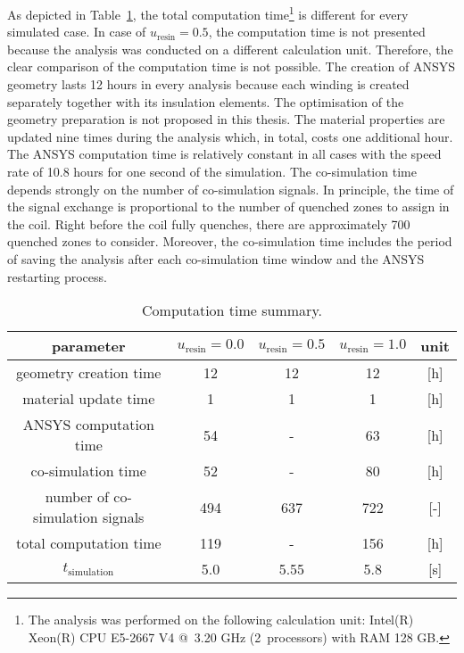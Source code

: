 As depicted in Table~\ref{table:skew_quad_computation_time_summary}, the total computation time\footnote{The analysis was performed on the following calculation unit: Intel(R) Xeon(R) CPU E5-2667 V4 @~3.20 GHz (2~processors) with RAM 128 GB.} is different for every simulated case. In case of $u_\text{resin}=0.5$, the computation time is not presented because the analysis was conducted on a different calculation unit. Therefore, the clear comparison of the computation time is not possible. The creation of ANSYS geometry lasts 12 hours in every analysis because each winding is created separately together with its insulation elements. The optimisation of the geometry preparation is not proposed in this thesis. The material properties are updated nine times during the analysis which, in total, costs one additional hour. The ANSYS computation time is relatively constant in all cases with the speed rate of 10.8 hours for one second of the simulation. The co-simulation time depends strongly on the number of co-simulation signals. In principle, the time of the signal exchange is proportional to the number of quenched zones to assign in the coil. Right before the coil fully quenches, there are approximately 700 quenched zones to consider. Moreover, the co-simulation time includes the period of saving the analysis after each co-simulation time window and the ANSYS restarting process.

\begin{table}[H]
    \caption{Computation time summary.} 
    \vspace{-1.em} 
    \fontsize{10}{10}
    \selectfont 
    \renewcommand{\arraystretch}{1.5}
    \begin{center}
        \begin{tabular}{ | c | c | c | c | c | }  
        \hline
        parameter & $u_\text{resin}=0.0$ & $u_\text{resin}=0.5$ & $u_\text{resin}=1.0$ & unit\\
        \hline
        geometry creation time & 12 & 12 & 12 & [h] \\
        material update time & 1 & 1 & 1 & [h] \\
        ANSYS computation time & 54 & - & 63 & [h] \\
        co-simulation time & 52 & - & 80 & [h] \\
        number of co-simulation signals & 494 & 637 & 722 & [-] \\
        \hline 
        total computation time & 119 & - & 156 & [h] \\
        \hline 
        $t_\text{simulation}$ & 5.0 & 5.55 & 5.8 & [s] \\
        \hline 
        \end{tabular}
    \end{center}  
     \label{table:skew_quad_computation_time_summary} 
\end{table}

